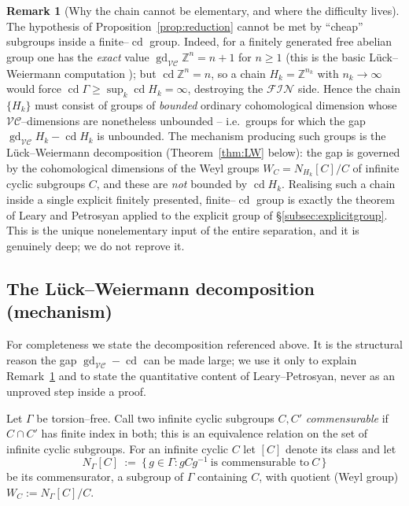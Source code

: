 \documentclass{amsart}
\theoremstyle{definition}
\newtheorem{remark}{Remark}
\newcommand{\Z}{\mathbb{Z}}
\newcommand{\FIN}{\mathcal{F\!I\!N}}
\newcommand{\VC}{\mathcal{V\!C}}
\newcommand{\gd}{\operatorname{gd}}
\newcommand{\cd}{\operatorname{cd}}
\begin{document}
\begin{remark}[Why the chain cannot be elementary, and where the difficulty lives]\label{rem:whyhard}
The hypothesis of Proposition~\ref{prop:reduction} cannot be met by ``cheap'' subgroups inside
a finite--$\cd$ group. Indeed, for a finitely generated free abelian group one has the
\emph{exact} value $\gd_{\VC}\Z^{n}=n+1$ for $n\ge 1$ (this is the basic Lück--Weiermann
computation \cite[\S5, Example 5.6 and the surrounding discussion]{LueckWeiermann}); but
$\cd\Z^{n}=n$, so a chain $H_k=\Z^{n_k}$ with $n_k\to\infty$ would force
$\cd\Gamma\ge\sup_k\cd H_k=\infty$, destroying the $\FIN$ side. Hence the chain $\{H_k\}$ must
consist of groups of \emph{bounded} ordinary cohomological dimension whose $\VC$--dimensions
are nonetheless unbounded -- i.e.\ groups for which the gap $\gd_{\VC}H_k-\cd H_k$ is
unbounded. The mechanism producing such groups is the Lück--Weiermann decomposition
(Theorem~\ref{thm:LW} below): the gap is governed by the cohomological dimensions of the Weyl
groups $W_C=N_{H_k}[C]/C$ of infinite cyclic subgroups $C$, and these are \emph{not} bounded by
$\cd H_k$. Realising such a chain inside a single explicit finitely presented, finite--$\cd$
group is exactly the theorem of Leary and Petrosyan applied to the explicit group of
\S\ref{subsec:explicitgroup}. This is the unique nonelementary input of the entire separation,
and it is genuinely deep; we do not reprove it.
\end{remark}

\subsection{The Lück--Weiermann decomposition (mechanism)}

For completeness we state the decomposition referenced above. It is the structural reason the
gap $\gd_{\VC}-\cd$ can be made large; we use it only to explain Remark~\ref{rem:whyhard} and to
state the quantitative content of Leary--Petrosyan, never as an unproved step inside a proof.

Let $\Gamma$ be torsion--free. Call two infinite cyclic subgroups $C,C'$ \emph{commensurable}
if $C\cap C'$ has finite index in both; this is an equivalence relation on the set of infinite
cyclic subgroups. For an infinite cyclic $C$ let $[C]$ denote its class and let
\[
N_\Gamma[C]\ :=\ \{\,g\in\Gamma : g C g^{-1}\ \text{is commensurable to}\ C\,\}
\]
be its commensurator, a subgroup of $\Gamma$ containing $C$, with quotient (Weyl group)
$W_C:=N_\Gamma[C]/C$.
\end{document}
